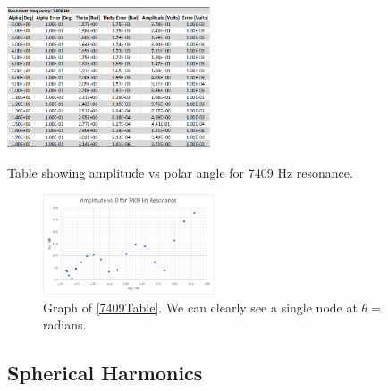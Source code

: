 \documentclass[12pt]{article}
\begin{document}
	\begin{multicols}{2}	
		\begin{table}[H]
			\includegraphics[width=0.45\textwidth]{Tables/7409Table.png}
			\caption{Table showing amplitude vs polar angle for 7409 Hz resonance.}
			\label{7409Table}		
		\end{table}
	\columnbreak
		\begin{figure}[H]
			\includegraphics[width=0.45\textwidth]{Graphs/7409Graph.png}
			\caption{Graph of \cref{7409Table}. We can clearly see a single node at $\theta = $ radians.}
			\label{7409Graph}
		\end{figure}
	\end{multicols}

	\subsection{Spherical Harmonics}
	
\end{document}
